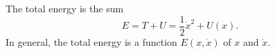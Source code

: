 The total energy is the sum
$$E = T + U = \frac{1}{2}\dot{x}^2 + U(x).$$
In general, the total energy is a function $E(x, \dot{x})$ of $x$ and $\dot{x}$.
